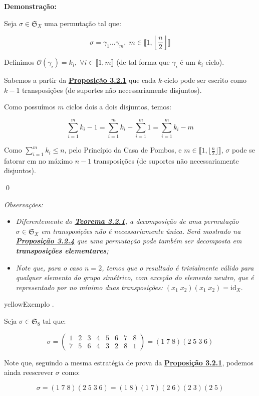 \documentclass[16pt,openany]{book}
\theoremstyle{definition}
\newtheorem{example}{Exemplo}[section]
\renewenvironment{example}[1][]{
  \refstepcounter{example}
  \begin{mybox}{yellow}{Exemplo \thesection.\arabic{example}}
}{\end{mybox}}
\begin{document}
\textbf{Demonstração:}

Seja $\sigma\in\mathfrak{S}_X$ uma permutação tal que:

\[
\sigma = \gamma_1\ldots\gamma_m,\; m\in\llbracket 1, \left\lfloor \frac{n}{2}\right\rfloor\rrbracket 
\]

Definimos $\mathcal{O}(\gamma_i) = k_i, \; \forall i\in\llbracket 1,m\rrbracket$ (de tal forma que $\gamma_i$ é um $k_i$-ciclo).

Sabemos a partir da \hyperlink{prop221}{\textbf{Proposição 3.2.1}} que cada $k$-ciclo pode ser escrito como $k-1$ transposições (de suportes não necessariamente disjuntos).

Como possuímos $m$ ciclos dois a dois disjuntos, temos:

\[
\sum_{i=1}^{m} k_i - 1 = \sum_{i=1}^{m} k_i - \sum_{i=1}^{m} 1 = \sum_{i=1}^{m} k_i - m
\]  

Como $\sum_{i=1}^m k_i \leq n$, pelo Princípio da Casa de Pombos, e $m\in\llbracket 1,\lfloor \frac{n}{2}\rfloor\rrbracket$, $\sigma$ pode se fatorar em no máximo $n-1$ transposições (de suportes não necessariamente disjuntos).

\qed

\textit{Observações:} 

\begin{itemize}
  \item \textit{Diferentemente do \hyperlink{teo221}{\textbf{Teorema 3.2.1}}, a decomposição de uma permutação $\sigma\in\mathfrak{S}_X$ em transposições não é necessariamente única. Será mostrado na \hyperlink{prop224}{\textbf{Proposição 3.2.4}} que uma permutação pode também ser decomposta em \textbf{transposições elementares};}
  \item \textit{Note que, para o caso $n = 2$, temos que o resultado é trivialmente válido para qualquer elemento do grupo simétrico, com exceção do elemento neutro, que é representado por no mínimo duas transposições: $(x_1\; x_2)(x_1\; x_2) = \text{id}_X$}.
\end{itemize}

\begin{example}
Seja $\sigma \in \mathfrak{S}_8$ tal que:

\[
\sigma = \begin{pmatrix}
1 & 2 & 3 & 4 & 5 & 6 & 7 & 8\\
7 & 5 & 6 & 4 & 3 & 2 & 8 & 1
\end{pmatrix}
= (1\;7\;8)(2\;5\;3\;6) 
\]

Note que, seguindo a mesma estratégia de prova da \hyperlink{prop221}{\textbf{Proposição 3.2.1}}, podemos ainda reescrever $\sigma$ como:

\[
\sigma = (1\;7\;8)(2\;5\;3\;6) = (1\;8)(1\;7)(2\;6)(2\;3)(2\;5)
\]
\end{example}
\end{document}
